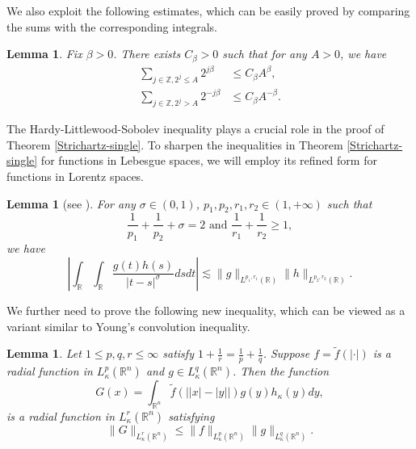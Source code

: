 \documentclass[a4paper,11pt, reqno]{amsart}
\numberwithin{equation}{section}
\theoremstyle{plain}
\newtheorem{lemma}[theorem]{Lemma}
\theoremstyle{definition}
\theoremstyle{remark}
\begin{document}
We also exploit the following estimates, which can be easily proved by comparing the sums with the corresponding integrals.
\begin{lemma}\label{Sum}
Fix $\beta>0$. There exists $C_\beta>0$ such that for any $A>0$, we have
\begin{align*}
\sum_{j\in\mathbb{Z}, 2^j\leq A}2^{j\beta}&\leq C_\beta A^\beta,\\
\sum_{j\in\mathbb{Z}, 2^j>A}2^{-j\beta}&\leq C_\beta A^{-\beta}.
\end{align*}
\end{lemma}
The Hardy-Littlewood-Sobolev inequality plays a crucial role in the proof of Theorem  \ref{Strichartz-single}. To sharpen the inequalities in Theorem \ref{Strichartz-single} for functions in Lebesgue spaces, we will employ its refined form for functions in Lorentz spaces.
\begin{lemma}[see \cite{Neil}] \label{H-L-S-Lorentz}
For any $\sigma\in (0,1)$, $p_1,p_2,r_1,r_2\in (1,+\infty)$ such that 
\begin{equation*}
\frac{1}{p_1}+\frac{1}{p_2}+\sigma=2 \text{ and } \frac{1}{r_1}+\frac{1}{r_2}\geq1,
\end{equation*}
we have
\begin{equation*}
    \left|\int_\mathbb{R}\int_\mathbb{R}\frac{g(t)h(s)}{|t-s|^\sigma}dsdt\right|\lesssim \|g\|_{L^{p_1,r_1}(\mathbb{R})}\|h\|_{L^{p_2,r_2}(\mathbb{R})}.
\end{equation*}
\end{lemma}
We further need to prove the following new inequality,  which can be viewed as  a variant similar to Young's convolution inequality.
\begin{lemma}\label{new inequality} Let $1\leq p,q,r\leq \infty$ satisfy $1+\frac{1}{r}=\frac{1}{p}+\frac{1}{q}$. Suppose $f=\tilde{f}(|\cdot|)$ is a radial function in $L_\kappa^p(\mathbb{R}^n)$ and $g\in L_\kappa^q(\mathbb{R}^n)$. Then the function
\begin{equation*}
G(x)=\int_{\mathbb{R}^n}\tilde{f}\left(\big||x|-|y|\big|\right)g(y)h_\kappa(y) dy,
\end{equation*}
is a radial function in $L_\kappa^r(\mathbb{R}^n)$ satisfying
\begin{equation*}
\|G\|_{L_\kappa^r(\mathbb{R}^n)}\leq \|f\|_{L_\kappa^p(\mathbb{R}^n)} \|g\|_{L_\kappa^q(\mathbb{R}^n)}.  
\end{equation*}
\end{lemma}
\end{document}
